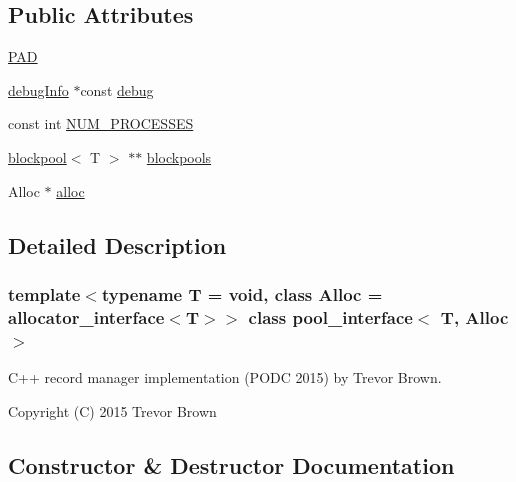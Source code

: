 \subsection*{Public Attributes}
\begin{DoxyCompactItemize}
\item 
\hyperlink{classpool__interface_a1b714295ba794862f8a11cc5ec25cec7}{P\+AD}
\item 
\hyperlink{classdebugInfo}{debug\+Info} $\ast$const \hyperlink{classpool__interface_ab609cb214dbd9228200698e6fd8256fe}{debug}
\item 
const int \hyperlink{classpool__interface_a66acd16c6997604702dff95487152570}{N\+U\+M\+\_\+\+P\+R\+O\+C\+E\+S\+S\+ES}
\item 
\hyperlink{classblockpool}{blockpool}$<$ T $>$ $\ast$$\ast$ \hyperlink{classpool__interface_a6585092dd9b946516287735834174726}{blockpools}
\item 
Alloc $\ast$ \hyperlink{classpool__interface_a920fcaa0f78cd3d45e6d128d18355f67}{alloc}
\end{DoxyCompactItemize}


\subsection{Detailed Description}
\subsubsection*{template$<$typename T = void, class Alloc = allocator\+\_\+interface$<$\+T$>$$>$\newline
class pool\+\_\+interface$<$ T, Alloc $>$}

C++ record manager implementation (P\+O\+DC 2015) by Trevor Brown.

Copyright (C) 2015 Trevor Brown 

\subsection{Constructor \& Destructor Documentation}
\mbox{\label{classpool__interface_aacd638d03ecbc3a7e0e3372d88b88629}} 
